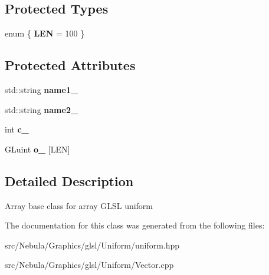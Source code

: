 \subsection*{\-Protected \-Types}
\begin{DoxyCompactItemize}
\item 
enum \{ {\bfseries \-L\-E\-N} =  100
 \}
\end{DoxyCompactItemize}
\subsection*{\-Protected \-Attributes}
\begin{DoxyCompactItemize}
\item 
\hypertarget{classNeb_1_1glsl_1_1Uniform_1_1Vector_1_1Base_a78a4f2843f5c87f11d67b5a29c95d6c2}{std\-::string {\bfseries name1\-\_\-}}\label{classNeb_1_1glsl_1_1Uniform_1_1Vector_1_1Base_a78a4f2843f5c87f11d67b5a29c95d6c2}

\item 
\hypertarget{classNeb_1_1glsl_1_1Uniform_1_1Vector_1_1Base_a2080091cb0f43f60e48f7c667cc3d65b}{std\-::string {\bfseries name2\-\_\-}}\label{classNeb_1_1glsl_1_1Uniform_1_1Vector_1_1Base_a2080091cb0f43f60e48f7c667cc3d65b}

\item 
\hypertarget{classNeb_1_1glsl_1_1Uniform_1_1Vector_1_1Base_adada72e697489b74dcca62bd2a6404d1}{int {\bfseries c\-\_\-}}\label{classNeb_1_1glsl_1_1Uniform_1_1Vector_1_1Base_adada72e697489b74dcca62bd2a6404d1}

\item 
\hypertarget{classNeb_1_1glsl_1_1Uniform_1_1Vector_1_1Base_a3e462add25f07b5e7b2815179f928b76}{\-G\-Luint {\bfseries o\-\_\-} \mbox{[}\-L\-E\-N\mbox{]}}\label{classNeb_1_1glsl_1_1Uniform_1_1Vector_1_1Base_a3e462add25f07b5e7b2815179f928b76}

\end{DoxyCompactItemize}


\subsection{\-Detailed \-Description}
\-Array base class for array \-G\-L\-S\-L uniform 

\-The documentation for this class was generated from the following files\-:\begin{DoxyCompactItemize}
\item 
src/\-Nebula/\-Graphics/glsl/\-Uniform/uniform.\-hpp\item 
src/\-Nebula/\-Graphics/glsl/\-Uniform/\-Vector.\-cpp\end{DoxyCompactItemize}
